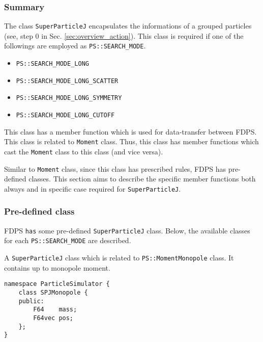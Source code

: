 \subsubsection{Summary}

The class \texttt{SuperParticleJ} encapsulates the informations of a grouped particles (see, step 0 in Sec. \ref{sec:overview_action}). This class is required if one of the followings are employed as \texttt{PS::SEARCH\_MODE}.
\begin{itemize}[itemsep=-1ex]
\item \texttt{PS::SEARCH\_MODE\_LONG}
\item \texttt{PS::SEARCH\_MODE\_LONG\_SCATTER}
\item \texttt{PS::SEARCH\_MODE\_LONG\_SYMMETRY}
\item \texttt{PS::SEARCH\_MODE\_LONG\_CUTOFF}  
\end{itemize}
This class has a member function which is used for data-transfer between FDPS. This class is related to \texttt{Moment} class. Thus, this class has member functions which cast the \texttt{Moment} class to this class (and vice versa).

Similar to \texttt{Moment} class, since this class has prescribed rules, FDPS has pre-defined classes.
This section aims to describe the specific member functions both always and in specific case required for \texttt{SuperParticleJ}.

\subsubsection{Pre-defined class}

FDPS \texttt{has} some pre-defined \texttt{SuperParticleJ} class. Below, the available classes for each \texttt{PS::SEARCH\_MODE} are described.


\label{sec:SPJMonopole}

A \texttt{SuperParticleJ} class which is related to \texttt{PS::MomentMonopole} class. It contains up to monopole moment.

\begin{screen}
\begin{verbatim}
namespace ParticleSimulator {
    class SPJMonopole {
    public:
        F64    mass;
        F64vec pos;
    };
}
\end{verbatim}
\end{screen}

